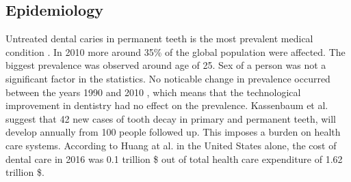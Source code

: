 \subsection{Epidemiology}
Untreated dental caries in permanent teeth is the most prevalent medical condition \cite{Kassebaum2015}. In 2010 more around 35\% of the global population were affected. The biggest prevalence was observed around age of 25. Sex of a person was not a significant factor in the statistics. No noticable change in prevalence occurred between the years 1990 and 2010 \cite{Kassebaum2015} \cite{Frencken2017}, which means that the technological improvement in dentistry had no effect on the prevalence.
Kassenbaum et al. suggest that 42 new cases of tooth decay in primary and permanent teeth, will develop annually from 100 people followed up. This imposes a burden on health care systems. According to Huang at al. \cite{Hung2020} in the United States alone, the cost of dental care in 2016 was 0.1 trillion \$ out of total health care expenditure of 1.62 trillion \$.